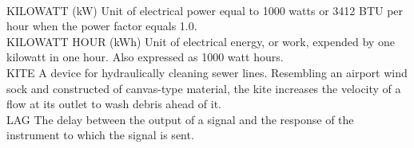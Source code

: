 \documentclass{article}
\begin{document}
\vspace{0.3cm}\\
KILOWATT (kW)
Unit of electrical power equal to 1000 watts or 3412 BTU per hour when the power factor equals 1.0.
\vspace{0.3cm}\\
KILOWATT HOUR (kWh)
Unit of electrical energy, or work, expended by one kilowatt in one hour. Also expressed as 1000 watt hours.
\vspace{0.3cm}\\
KITE
A device for hydraulically cleaning sewer lines. Resembling an airport wind sock and constructed of canvas-type material, the kite increases the velocity of a flow at its outlet to wash debris ahead of it. 
\vspace{0.3cm}\\
LAG
The delay between the output of a signal and the response of the instrument to which the signal is sent.
\vspace{0.3cm}\\
\end{document}

